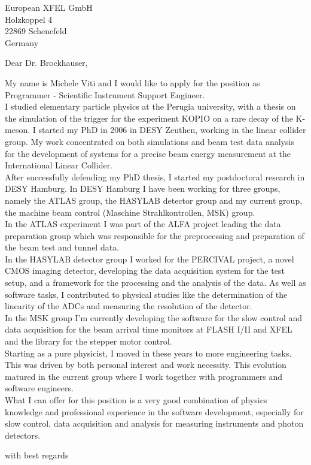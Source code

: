 \documentclass[ebner,paper=a4,fontsize=11pt,ngerman,BCOR=10mm]{scrlttr2}%
\begin{document}
\pagestyle{empty}

\begin{letter}{European XFEL GmbH \\
Holzkoppel 4 \\
22869 Schenefeld \\
Germany}


\setlength{\parindent}{15pt}

\opening{Dear Dr. Brockhauser,}

My name is Michele Viti and I would like to apply for the position as Programmer
- Scientific Instrument Support Engineer.\\
\indent I studied elementary particle physics at the Perugia university, with a
thesis on the simulation of the trigger for the experiment KOPIO on a rare decay of
the K-meson. I started my PhD in 2006 in DESY Zeuthen, working in the linear
collider group. My work concentrated on both simulations and beam test data
analysis for the development of systems for a precise beam energy measurement
at the International Linear Collider.\\
\indent After successfully defending my PhD thesis, I started my postdoctoral
research in DESY Hamburg. In DESY Hamburg I have been working for three groups, namely
the ATLAS group, the HASYLAB detector group and my current group, the machine
beam control (Maschine Strahlkontrollen, MSK) group.\\
In the ATLAS experiment I was part of the ALFA project leading the data
preparation group which was responsible for the preprocessing and preparation of
the beam test and tunnel data.  \\
In the HASYLAB detector group I worked for the PERCIVAL project, a novel CMOS
imaging detector, developing the data acquisition system for the test setup, and
a framework for the processing and the analysis of the data. As well as software
tasks, I contributed to physical studies like the determination of the linearity
of the ADCs and measuring the resolution of the detector.\\
In the MSK group I'm currently developing the software for the slow
control and data acquisition for the beam arrival time monitors at FLASH I/II
and XFEL and the library for the stepper motor control.\\
\indent Starting as a pure physicist, I moved in these years to more
engineering tasks. This was driven by both personal interest and work necessity.
This evolution matured in the current group where I work together with
programmers and software engineers.\\
\indent What I can offer for this position is a very good combination of physics
knowledge and professional experience in the software development, especially
for slow control, data acquisition and analysis for measuring instruments and
photon detectors.

\closing{with best regards}
\enlargethispage{6\baselineskip}

\end{letter}
\end{document}
